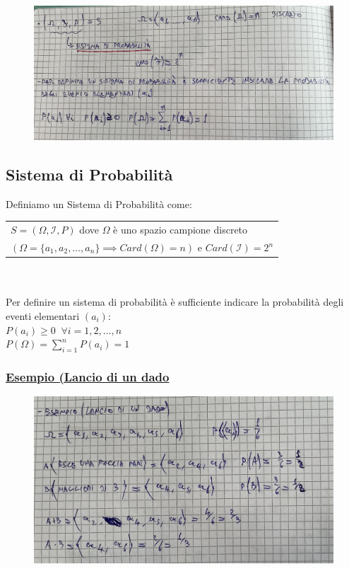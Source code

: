 \documentclass{article}
\begin{document}
\begin{figure}[ht]
\centering
\includegraphics[scale=0.13]{ese/1a.jpeg} 
\end{figure}

\subsection{Sistema di Probabilità}
Definiamo un Sistema di Probabilità come: \\
\begin{tabular}{|p{13cm}}
$S = (\Omega, \mathcal{I}, P)$ dove $\Omega$ è uno spazio campione discreto \\
$\left( \Omega=\{a_1, a_2, \dots, a_n\} \implies Card(\Omega) = n \right)$ e $Card(\mathcal{I}) = 2^n$
\end{tabular} \\ \\
Per definire un sistema di probabilità è sufficiente indicare la probabilità degli eventi elementari $\left( a_i \right)$: \\
$P(a_i) \geq 0 \;\; \forall i=1,2,\dots,n $ \\
$P(\Omega) = \sum_{i=1}^{n} P(a_i) = 1$
\newpage
\subsubsection{\underline{Esempio (Lancio di un dado}}
\begin{figure}[ht]
\centering
\includegraphics[scale=0.13]{ese/2.jpeg} 
\end{figure}
\end{document}

